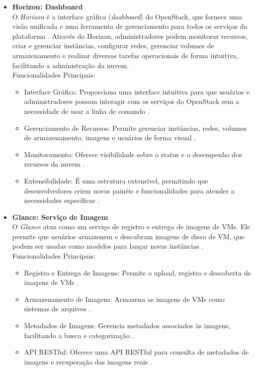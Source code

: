 \begin{itemize}
\begin{itemize}
    \item \textbf{Horizon: Dashboard}\\
    O \textit{Horizon} é a interface gráfica (\textit{dashboard}) do OpenStack, que fornece uma visão unificada e uma ferramenta de gerenciamento para todos os serviços da plataforma \cite{openstack2025}. Através do Horizon, administradores podem monitorar recursos, criar e gerenciar instâncias, configurar redes, gerenciar volumes de armazenamento e realizar diversas tarefas operacionais de forma intuitiva, facilitando a administração da nuvem.\\
    Funcionalidades Principais:
    \begin{itemize}
        \item Interface Gráfica: Proporciona uma interface intuitiva para que usuários e administradores possam interagir com os serviços do OpenStack sem a necessidade de usar a linha de comando \cite{openstack2025}.
        \item Gerenciamento de Recursos: Permite gerenciar instâncias, redes, volumes de armazenamento, imagens e usuários de forma visual \cite{openstack2025}.
        \item Monitoramento: Oferece visibilidade sobre o status e o desempenho dos recursos da nuvem \cite{openstack2025}.
        \item Extensibilidade: É uma estrutura extensível, permitindo que desenvolvedores criem novos painéis e funcionalidades para atender a necessidades específicas \cite{openstack2025}.
    \end{itemize}

    \item \textbf{Glance: Serviço de Imagem}\\
    O \textit{Glance} atua como um serviço de registro e entrega de imagens de VMs. Ele permite que usuários armazenem e descubram imagens de disco de VM, que podem ser usadas como modelos para lançar novas instâncias \cite{openstack2024}.\\
    Funcionalidades Principais:
    \begin{itemize}
        \item Registro e Entrega de Imagens: Permite o upload, registro e descoberta de imagens de VMs \cite{openstack2024}.
        \item Armazenamento de Imagens: Armazena as imagens de VMs como sistemas de arquivos \cite{openstack2024}.
        \item Metadados de Imagens: Gerencia metadados associados às imagens, facilitando a busca e categorização \cite{openstack2024}.
        \item API RESTful: Oferece uma API RESTful para consulta de metadados de imagens e recuperação das imagens reais \cite{openstack2024}.
    \end{itemize}


\end{itemize}
\end{itemize}
